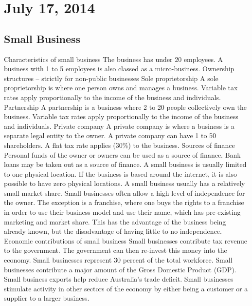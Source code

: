 \section{July 17, 2014}

\subsection{Small Business}
\begin{outline}
\1 Characteristics of small business
\2 The business has under 20 employees. A business with 1 to 5 employees is also classed as a micro-business.
\2 Ownership structures -- strictly for non-public businesses
\3 Sole proprietorship
\4 A sole proprietorship is where one person owns and manages a business. Variable tax rates apply proportionally to the income of the business and individuals.
\3 Partnership
\4 A partnership is a business where 2 to 20 people collectively own the business. Variable tax rates apply proportionally to the income of the business and individuals.
\3 Private company
\4 A private company is where a business is a separate legal entity to the owner. A private company can have 1 to 50 shareholders. A flat tax rate applies (30\%) to the business.
\2 Sources of finance
\3 Personal funds of the owner or owners can be used as a source of finance.
\3 Bank loans may be taken out as a source of finance.
\2 A small business is usually limited to one physical location. If the business is based around the internet, it is also possible to have zero physical locations.
\2 A small business usually has a relatively small market share.
\2 Small businesses often allow a high level of independence for the owner. 
\3 The exception is a franchise, where one buys the rights to a franchise in order to use their business model and use their name, which has pre-existing marketing and market share. This has the advantage of the business being already known, but the disadvantage of having little to no independence.
\1 Economic contributions of small business
\2 Small businesses contribute tax revenue to the government. The government can then re-invest this money into the economy.
\2 Small businesses represent 30 percent of the total workforce.
\2 Small businesses contribute a major amount of the Gross Domestic Product (GDP).
\2 Small business exports help reduce Australia's trade deficit.
\2 Small businesses stimulate activity in other sectors of the economy by either being a customer or a supplier to a larger business.
\end{outline}